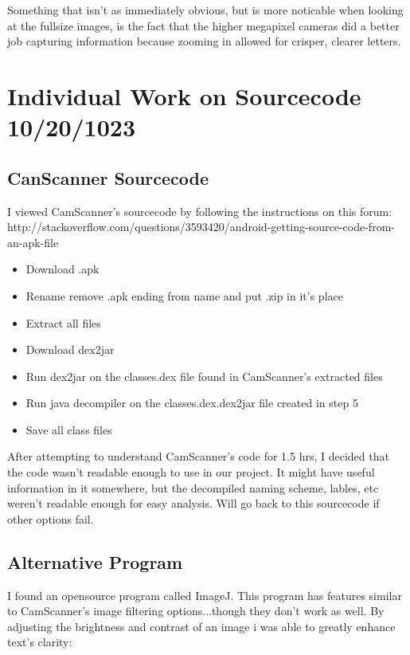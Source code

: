\documentclass[]{article}
\begin{document}
		Something that isn't as immediately obvious, but is more noticable when looking at the fullsize images, is the fact that the higher megapixel cameras did a better job capturing information because zooming in allowed for crisper, clearer letters. \\
	
	\section{Individual Work on Sourcecode 10/20/1023}
		
		\subsection{CanScanner Sourcecode}
		I viewed CamScanner's sourcecode by following the instructions on this forum: \\
		http://stackoverflow.com/questions/3593420/android-getting-source-code-from-an-apk-file\\
		
		\begin{itemize}
			\item Download .apk
			\item Rename remove .apk ending from name and put .zip in it's place
			\item Extract all files
			\item Download dex2jar
			\item Run dex2jar on the classes.dex file found in CamScanner's extracted files
			\item Run java decompiler on the classes.dex.dex2jar file created in step 5
			\item Save all class files
		\end{itemize}
		
		After attempting to understand CamScanner's code for 1.5 hrs, I decided that the code wasn't readable enough to use in our project. It might have useful information in it somewhere, but the decompiled naming scheme, lables, etc weren't readable enough for easy analysis. Will go back to this sourcecode if other options fail.
		
		\subsection{Alternative Program}
		
		I found an opensource program called ImageJ. This program has features similar to CamScanner's image filtering options...though they don't work as well. By adjusting the brightness and contrast of an image i was able to greatly enhance text's clarity: \\
		
\end{document}
